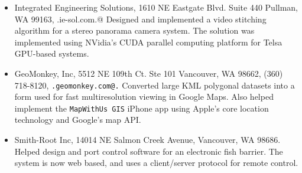 \documentclass[10pt]{article}
\begin{document}

\vspace{0.25cm}


\begin{itemize}

\item Integrated Engineering Solutions, 
1610 NE Eastgate Blvd.
Suite 440
Pullman, WA 99163,
\verb@www.ie-sol.com.@
Designed and implemented a video stitching algorithm for
a stereo panorama camera system. The solution was
implemented using NVidia's CUDA parallel computing platform
for Telsa GPU-based systems.


\item GeoMonkey, Inc, 
5512 NE 109th Ct. Ste 101
Vancouver, WA 98662,
(360) 718-8120,
{\tt \verb@www.geomonkey.com@.}  
  Converted large KML polygonal datasets into a form used for
  fast multiresolution viewing in Google Maps.
  Also helped implement the {\tt MapWithUs GIS} iPhone app using Apple's core location technology
  and Google's map API.
\item Smith-Root Inc, 14014 NE Salmon Creek Avenue, Vancouver, WA 98686.\\
Helped design and port control software for an
electronic fish barrier. The system is now web based, and uses a 
client/server protocol for remote control.
\end{itemize}
\end{document}
